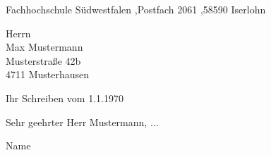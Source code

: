 \documentclass[a4paper, 10pt, parskip=off, headheight=25mm, footheight=25mm]{scrartcl}
\newcommand{\name}{{{Name}}}
\newcommand{\postfach}{Fachhochschule Südwestfalen \sep Postfach 2061 \sep 58590 Iserlohn}
\begin{document}
\daten %
\begin{addmargin}[0mm]{\randbreite}

\begin{absender}
\postfach
\end{absender}

\begin{empfaenger}
{{Herrn\\Max Mustermann\\Musterstraße 42b\\4711 Musterhausen}}
\end{empfaenger}

\begin{betreff}
{{Ihr Schreiben vom 1.1.1970}}
\end{betreff}

\begin{text}
{{Sehr geehrter Herr Mustermann, ... }}
\end{text}

\vspace{15mm}
\name

\end{addmargin}
\end{document}

